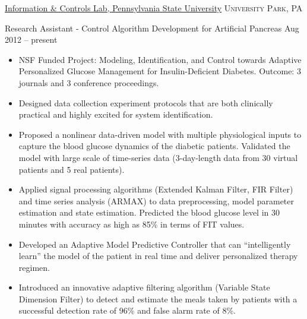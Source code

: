 \documentclass[10pt,a4paper]{article}
\begin{document}
\headedsection
{\href{http://sites.psu.edu/jinyuxie/research/}{Information \& Controls Lab, Pennsylvania State University}}
{\textsc{University Park, PA}}
  {
    \headedsubsection
    {Research Assistant - Control Algorithm Development for Artificial Pancreas}
    {Aug 2012 -- present}
    {
      \begin{itemize}
      \item NSF Funded Project:
        Modeling, Identification, and Control towards Adaptive Personalized Glucose
        Management for Insulin-Deficient Diabetes. Outcome: 3 journals and 3 conference proceedings.
        
      \item Designed data collection experiment protocols that are both
        clinically practical and highly excited for system identification.

      \item Proposed a nonlinear data-driven model with multiple physiological
        inputs to capture the blood glucose dynamics of the diabetic patients.
        Validated the model with large scale of time-series data (3-day-length
        data from 30 virtual patients and 5 real patients). 
        
      \item Applied signal processing algorithms (Extended Kalman Filter, FIR
        Filter) and time series analysis (ARMAX) to data preprocessing, model
        parameter estimation and state estimation. Predicted the blood glucose level in 30
        minutes with accuracy as high as 85\% in terms of FIT values.

      \item Developed an Adaptive Model Predictive Controller that can
        ``intelligently learn'' the model of the patient in real time and deliver
        personalized therapy regimen.
        
      \item Introduced an innovative adaptive filtering algorithm (Variable
        State Dimension Filter) to detect and estimate the meals taken by
        patients with a successful detection rate of 96\% and false alarm rate
        of 8\%.
      \end{itemize}
    }
  }
\end{document}
